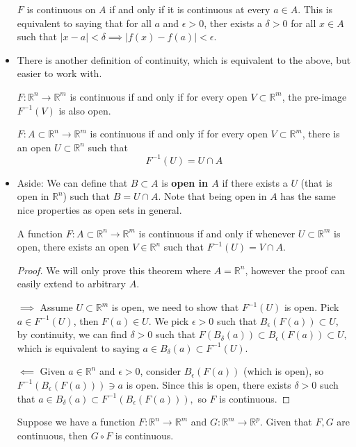 \begin{itemize}
\begin{definition}
              $F$ is continuous on $A$ if and only if it is continuous at every $a\in A$. This is equivalent to saying that for all $a$ and $\epsilon >0$, ther exists a $\delta > 0$ for all $x \in A$ such that $|x-a|<\delta \implies |f(x)-f(a)|<\epsilon.$
          \end{definition}
    \item There is another definition of continuity, which is equivalent to the above, but easier to work with.
          \begin{theorem}
              $F:\mathbb{R}^n\rightarrow \mathbb{R}^m$ is continuous if and only if for every open $V\subset \mathbb{R}^m$, the pre-image $F^{-1}(V)$ is also open.
          \end{theorem}
          \begin{theorem}
              $F:A\subset \mathbb{R}^n \rightarrow \mathbb{R}^m$ is continuous if and only if for every open $V \subset \mathbb{R}^m$, there is an open $U \subset \mathbb{R}^n$ such that
              \begin{equation}
                  F^{-1}(U) = U \cap A
              \end{equation}
          \end{theorem}
    \item Aside: We can define that $B\subset A$ is \textbf{open in $A$} if there exists a $U$ (that is open in $\mathbb{R}^n$) such that $B=U\cap A$. Note that being open in $A$ has the same nice properties as open sets in general.
          \begin{theorem}
              A function $F:A\subset \mathbb{R}^n \rightarrow \mathbb{R}^m$ is continuous if and only if whenever $U\subset \mathbb{R}^m$ is open, there exists an open $V\in \mathbb{R}^n$ such that $F^{-1}(U) = V \cap A$.
          \end{theorem}
          \begin{proof}
              We will only prove this theorem where $A=\mathbb{R}^n$, however the proof can easily extend to arbitrary $A$.

              $\implies$ Assume $U\subset \mathbb{R}^m$ is open, we need to show that $F^{-1}(U)$ is open. Pick $a\in F^{-1}(U)$, then $F(a) \in U$. We pick $\epsilon >0$ such that $B_\epsilon(F(a)) \subset U$, by continuity, we can find $\delta > 0$ such that $F(B_\delta(a)) \subset B_\epsilon(F(a)) \subset U,$ which is equivalent to saying $a\in B_\delta(a) \subset F^{-1}(U).$

              $\impliedby$ Given $a\in \mathbb{R}^n$ and $\epsilon >0$, consider $B_\epsilon(F(a))$ (which is open), so $F^{-1}(B_\epsilon(F(a))) \ni a$ is open. Since this is open, there exists $\delta > 0$ such that $a\in B_\delta(a) \subset F^{-1}(B_\epsilon(F(a))),$ so $F$ is continuous.
          \end{proof}
          \begin{theorem}
              Suppose we have a function $F:\mathbb{R}^n\rightarrow \mathbb{R}^m$ and $G: \mathbb{R}^m \rightarrow \mathbb{R}^p.$ Given that $F,G$ are continuous, then $G \circ F$ is continuous.
              \vspace{2mm}


\end{theorem}
\end{itemize}
